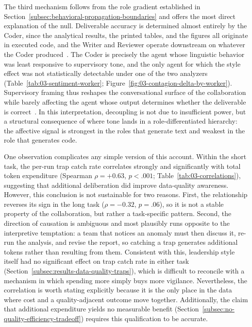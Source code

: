 The third mechanism follows from the role gradient established in Section~\ref{subsec:behavioral-propagation-boundaries} and offers the most direct explanation of the null.
Deliverable accuracy is determined almost entirely by the Coder, since the analytical results, the printed tables, and the figures all originate in executed code, and the Writer and Reviewer operate downstream on whatever the Coder produced~\cite{qian2024chatdevcommunicativeagentssoftware, hong2024metagptmetaprogrammingmultiagent}.
The Coder is precisely the agent whose linguistic behavior was least responsive to supervisory tone, and the only agent for which the style effect was not statistically detectable under one of the two analyzers (Table~\ref{tab:03-sentiment-worker}; Figure~\ref{fig:03-contagion-delta-by-worker}).
Supervisory framing thus reshapes the conversational surface of the collaboration while barely affecting the agent whose output determines whether the deliverable is correct~\cite{kwak2026leadershipcoordinationcontrolbehavioral}.
In this interpretation, decoupling is not due to insufficient power, but a structural consequence of where tone lands in a role-differentiated hierarchy: the affective signal is strongest in the roles that generate text and weakest in the role that generates code.

One observation complicates any simple version of this account.
Within the short task, the per-run trap catch rate correlates strongly and significantly with total token expenditure (Spearman $\rho = +0.63$, $p < .001$; Table~\ref{tab:03-correlations}), suggesting that additional deliberation did improve data-quality awareness.
However, this conclusion is not sustainable for two reasons. 
First, the relationship reverses its sign in the long task ($\rho = -0.32$, $p = .06$), so it is not a stable property of the collaboration, but rather a task-specific pattern.
Second, the direction of causation is ambiguous and most plausibly runs opposite to the interpretive temptation: a team that notices an anomaly must then discuss it, re-run the analysis, and revise the report, so catching a trap generates additional tokens rather than resulting from them.
Consistent with this, leadership style itself had no significant effect on trap catch rate in either task (Section~\ref{subsec:results-data-quality-traps}), which is difficult to reconcile with a mechanism in which spending more simply buys more vigilance.
Nevertheless, the correlation is worth stating explicitly because it is the only place in the data where cost and a quality-adjacent outcome move together.
Additionally, the claim that additional expenditure yields no measurable benefit (Section~\ref{subsec:no-quality-efficiency-tradeoff}) requires this qualification to be accurate.

